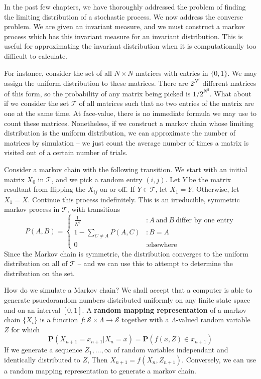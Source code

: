 In the past few chapters, we have thoroughly addressed the problem of finding the limiting distribution of a stochastic process. We now address the converse problem. We are given an invariant measure, and we must construct a markov process which has this invariant measure for an invariant distribution. This is useful for approximating the invariant distribution when it is computationally too difficult to calculate.

For instance, consider the set of all $N \times N$ matrices with entries in $\{0,1\}$. We may assign the uniform distribution to these matrices. There are $2^{N^2}$ different matrices of this form, so the probability of any matrix being picked is $1/2^{N^2}$. What about if we consider the set $\mathcal{T}$ of all matrices such that no two entries of the matrix are one at the same time. At face-value, there is no immediate formula we may use to count these matrices. Nonetheless, if we construct a markov chain whose limiting distribution is the uniform distribution, we can approximate the number of matrices by simulation -- we just count the average number of times a matrix is visited out of a certain number of trials.

Consider a markov chain with the following transition. We start with an initial matrix $X_0$ in $\mathcal{T}$, and we pick a random entry $(i,j)$. Let $Y$ be the matrix resultant from flipping the $X_{ij}$ on or off. If $Y \in \mathcal{T}$, let $X_1 = Y$. Otherwise, let $X_1 = X$. Continue this process indefinitely. This is an irreducible, symmetric markov process in $\mathcal{T}$, with transitions
%
\[
    P(A,B) =
    \begin{cases}
        \frac{1}{N^2} & : A\ \text{and}\ B\ \text{differ by one entry}\\
        1 - \sum_{C \neq A} P(A,C) & : B = A\\
        0 & : \text{elsewhere}
    \end{cases}
\]
%
Since the Markov chain is symmetric, the distribution converges to the uniform distribution on all of $\mathcal{T}$ -- and we can use this to attempt to determine the distribution on the set.

How do we simulate a Markov chain? We shall accept that a computer is able to generate psuedorandom numbers distributed uniformly on any finite state space and on an interval $[0,1]$. A {\bf random mapping representation} of a markov chain $\{ X_i \}$ is a function $f:\mathcal{S} \times \Lambda \to \mathcal{S}$ together with a $\Lambda$-valued random variable $Z$ for which
%
\[ \mathbf{P}(X_{n+1} = x_{n+1} | X_n = x) = \mathbf{P}(f(x,Z) \in x_{n+1}) \]
%
If we generate a sequence $Z_1, \dots, \infty$ of random variables independant and identically distributed to $Z$, Then $X_{n+1} = f(X_n,Z_{n+1})$. Conversely, we can use a random mapping representation to generate a markov chain.

